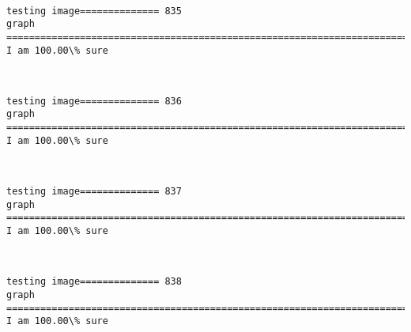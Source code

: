 \documentclass[11pt]{article}
\begin{document}
    \begin{center}
    \end{center}
    { \hspace*{\fill} \\}
    
    \begin{Verbatim}[commandchars=\\\{\}]
testing image============== 835
graph
============================================================================
I am 100.00\% sure

    \end{Verbatim}

    \begin{center}
    \end{center}
    { \hspace*{\fill} \\}
    
    \begin{Verbatim}[commandchars=\\\{\}]
testing image============== 836
graph
============================================================================
I am 100.00\% sure

    \end{Verbatim}

    \begin{center}
    \end{center}
    { \hspace*{\fill} \\}
    
    \begin{Verbatim}[commandchars=\\\{\}]
testing image============== 837
graph
============================================================================
I am 100.00\% sure

    \end{Verbatim}

    \begin{center}
    \end{center}
    { \hspace*{\fill} \\}
    
    \begin{Verbatim}[commandchars=\\\{\}]
testing image============== 838
graph
============================================================================
I am 100.00\% sure

    \end{Verbatim}
\end{document}
